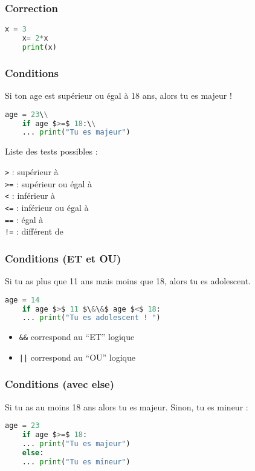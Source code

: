 \documentclass{beamer}
\begin{document}
\begin{frame}[fragile]
  \frametitle{Correction}
  \begin{lstlisting}[language=python]
    x = 3
    x= 2*x
    print(x)
  \end{lstlisting}
\end{frame}

\begin{frame}[fragile]
    \frametitle{Conditions}
    Si ton age est supérieur ou égal à 18 ans, alors tu es majeur !
    \begin{lstlisting}[language=python]
    age = 23\\
    if age $>=$ 18:\\
    ... print("Tu es majeur")
    \end{lstlisting}

    \medbreak
    Liste des tests possibles :

    \texttt{>}  : supérieur à\\
    \texttt{>=} : supérieur ou égal à\\
    \texttt{<}  : inférieur à\\
    \texttt{<=} : inférieur ou égal à\\
    \texttt{==} : égal à\\
    \texttt{!=} : différent de\\

\end{frame}

\begin{frame}[fragile]
    \frametitle{Conditions (ET et OU)}
    Si tu as plus que 11 ans mais moins que 18, alors tu es adolescent.
    \medbreak
    \begin{lstlisting}[language=python]
    age = 14
    if age $>$ 11 $\&\&$ age $<$ 18:
    ... print("Tu es adolescent ! ")
    \end{lstlisting}

    \medbreak
    \begin{itemize}
    \item     \texttt{\&\&} correspond au ``ET'' logique \\
    \item     \texttt{||} correspond au ``OU'' logique
    \end{itemize}
\end{frame}

\begin{frame}[fragile]
    \frametitle{Conditions (avec else)}
    Si tu as au moins 18 ans alors tu es majeur. Sinon, tu es mineur :
    \medbreak
    \begin{lstlisting}[language=python]
    age = 23
    if age $>=$ 18:
    ... print("Tu es majeur")
    else:
    ... print("Tu es mineur")
    \end{lstlisting}

\end{frame}
\end{document}
